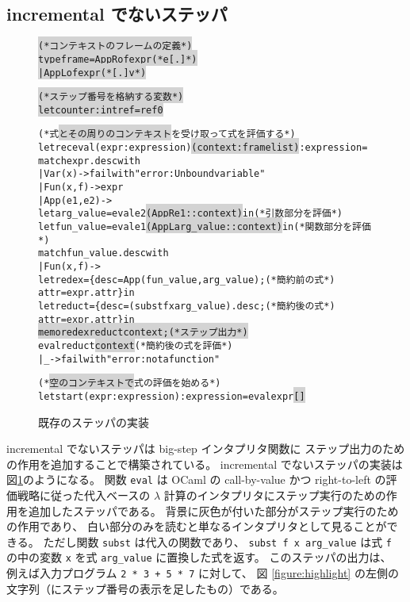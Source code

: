 \subsection{incremental でないステッパ}

\begin{figure}[t]
\begin{spacing}{0.8}
  \begin{alltt}
\colorbox{lightgray}{(* コンテキストのフレームの定義 *)}
\colorbox{lightgray}{type frame = AppR of expr  (* e [.] *)}
\colorbox{lightgray}{           | AppL of expr  (* [.] v *)}

\colorbox{lightgray}{(* ステップ番号を格納する変数 *)}
\colorbox{lightgray}{let counter : int ref = ref 0}

(* 式\colorbox{lightgray}{とその周りのコンテキスト}を受け取って式を評価する *)
let rec eval (expr : expression) \colorbox{lightgray}{(context : frame list)} : expression =
  match expr.desc with
  | Var (x) -> failwith "error: Unbound variable"
  | Fun (x, f) -> expr
  | App (e1, e2) ->
    let arg\_value = eval e2 \colorbox{lightgray}{(AppR e1 :: context)} in         (* 引数部分を評価 *)
    let fun\_value = eval e1 \colorbox{lightgray}{(AppL arg\_value :: context)} in  (* 関数部分を評価 *)
    match fun\_value.desc with
    | Fun (x, f) ->
    let redex = \{desc = App (fun\_value, arg\_value);             (* 簡約前の式 *)
                 attr = expr.attr\} in
      let reduct = \{desc = (subst f x arg\_value).desc ;         (* 簡約後の式 *)
                    attr = expr.attr\} in
      \colorbox{lightgray}{memo redex reduct context;                              (* ステップ出力 *)}
      eval reduct \colorbox{lightgray}{context}                                 (* 簡約後の式を評価 *)
    | \_ -> failwith "error: not a function"

(* \colorbox{lightgray}{空のコンテキストで}式の評価を始める *)
let start (expr : expression) : expression = eval expr \colorbox{lightgray}{[]}
\end{alltt}
\end{spacing}
\caption{既存のステッパの実装}
\label{figure:old-stepper}
\end{figure}

incremental でないステッパは big-step インタプリタ関数に
ステップ出力のための作用を追加することで構築されている。
incremental でないステッパの実装は図\ref{figure:old-stepper}のようになる。
関数 \texttt{eval} は OCaml の call-by-value かつ right-to-left
の評価戦略に従った代入ベースの $\lambda$
計算のインタプリタにステップ実行のための作用を追加したステッパである。
背景に灰色が付いた部分がステップ実行のための作用であり、
白い部分のみを読むと単なるインタプリタとして見ることができる。
ただし関数 \texttt{subst} は代入の関数であり、
\texttt{subst f x arg\_value} は式 \texttt{f} の中の変数
\texttt{x} を式 \texttt{arg\_value} に置換した式を返す。
このステッパの出力は、
例えば入力プログラム \texttt{2 * 3 + 5 * 7} に対して、
図 \ref{figure:highlight} の左側の文字列（にステップ番号の表示を足したもの）である。


